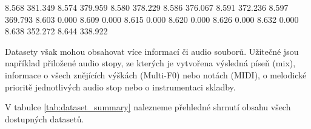 \begin{code}[xrightmargin=20em]

8.568     381.349
8.574     379.959
8.580     378.229
8.586     376.067
8.591     372.236
8.597     369.793
8.603     0.000
8.609     0.000
8.615     0.000
8.620     0.000
8.626     0.000
8.632     0.000
8.638     352.272
8.644     338.922

\end{code}

Datasety však mohou obsahovat více informací či audio souborů. Užitečné jsou například přiložené audio stopy, ze kterých je vytvořena výsledná píseň (mix), informace o všech znějících výškách (Multi-F0) nebo notách (MIDI), o melodické prioritě jednotlivých audio stop nebo o instrumentaci skladby.

V tabulce \ref{tab:dataset_summary} nalezneme přehledné shrnutí obsahu všech dostupných datasetů.


